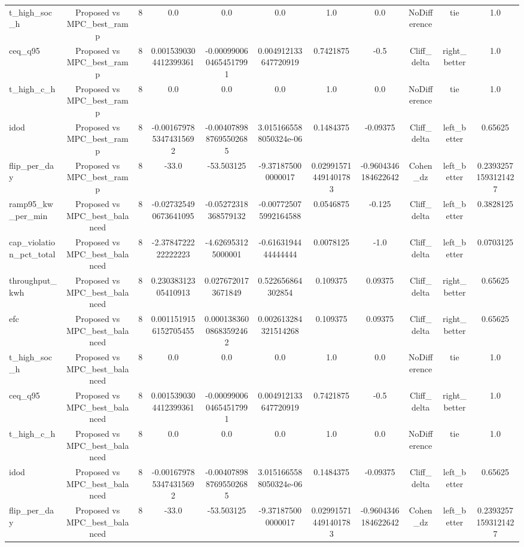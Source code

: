 \begin{table}[t]
\begin{tabular}{lcccccccccc}
t\_high\_soc\_h & Proposed vs MPC\_best\_ramp & 8 & 0.0 & 0.0 & 0.0 & 1.0 & 0.0 & NoDifference & tie & 1.0 \\
ceq\_q95 & Proposed vs MPC\_best\_ramp & 8 & 0.0015390304412399361 & -0.0009900604654517991 & 0.004912133647720919 & 0.7421875 & -0.5 & Cliff\_delta & right\_better & 1.0 \\
t\_high\_c\_h & Proposed vs MPC\_best\_ramp & 8 & 0.0 & 0.0 & 0.0 & 1.0 & 0.0 & NoDifference & tie & 1.0 \\
idod & Proposed vs MPC\_best\_ramp & 8 & -0.0016797853474315692 & -0.0040789887695502685 & 3.0151665588050324e-06 & 0.1484375 & -0.09375 & Cliff\_delta & left\_better & 0.65625 \\
flip\_per\_day & Proposed vs MPC\_best\_ramp & 8 & -33.0 & -53.503125 & -9.371875000000017 & 0.029915714491401783 & -0.9604346184622642 & Cohen\_dz & left\_better & 0.23932571593121427 \\
ramp95\_kw\_per\_min & Proposed vs MPC\_best\_balanced & 8 & -0.027325490673641095 & -0.05272318368579132 & -0.007725075992164588 & 0.0546875 & -0.125 & Cliff\_delta & left\_better & 0.3828125 \\
cap\_violation\_pct\_total & Proposed vs MPC\_best\_balanced & 8 & -2.3784722222222223 & -4.626953125000001 & -0.6163194444444444 & 0.0078125 & -1.0 & Cliff\_delta & left\_better & 0.0703125 \\
throughput\_kwh & Proposed vs MPC\_best\_balanced & 8 & 0.23038312305410913 & 0.0276720173671849 & 0.522656864302854 & 0.109375 & 0.09375 & Cliff\_delta & right\_better & 0.65625 \\
efc & Proposed vs MPC\_best\_balanced & 8 & 0.0011519156152705455 & 0.00013836008683592462 & 0.002613284321514268 & 0.109375 & 0.09375 & Cliff\_delta & right\_better & 0.65625 \\
t\_high\_soc\_h & Proposed vs MPC\_best\_balanced & 8 & 0.0 & 0.0 & 0.0 & 1.0 & 0.0 & NoDifference & tie & 1.0 \\
ceq\_q95 & Proposed vs MPC\_best\_balanced & 8 & 0.0015390304412399361 & -0.0009900604654517991 & 0.004912133647720919 & 0.7421875 & -0.5 & Cliff\_delta & right\_better & 1.0 \\
t\_high\_c\_h & Proposed vs MPC\_best\_balanced & 8 & 0.0 & 0.0 & 0.0 & 1.0 & 0.0 & NoDifference & tie & 1.0 \\
idod & Proposed vs MPC\_best\_balanced & 8 & -0.0016797853474315692 & -0.0040789887695502685 & 3.0151665588050324e-06 & 0.1484375 & -0.09375 & Cliff\_delta & left\_better & 0.65625 \\
flip\_per\_day & Proposed vs MPC\_best\_balanced & 8 & -33.0 & -53.503125 & -9.371875000000017 & 0.029915714491401783 & -0.9604346184622642 & Cohen\_dz & left\_better & 0.23932571593121427 \\
\bottomrule
\end{tabular}
\end{table}